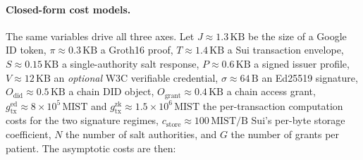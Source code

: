 \paragraph{Closed-form cost models.}
The same variables drive all three axes. Let $J\!\approx\!1.3\,\mathrm{KB}$
be the size of a Google ID token, $\pi\!\approx\!0.3\,\mathrm{KB}$ a
Groth16 proof, $T\!\approx\!1.4\,\mathrm{KB}$ a Sui transaction
envelope, $S\!\approx\!0.15\,\mathrm{KB}$ a single-authority salt
response, $P\!\approx\!0.6\,\mathrm{KB}$ a signed issuer profile,
$V\!\approx\!12\,\mathrm{KB}$ an \emph{optional} W3C verifiable
credential, $\sigma\!\approx\!64\,\mathrm{B}$ an Ed25519 signature,
$O_{\text{did}}\!\approx\!0.5\,\mathrm{KB}$ a chain DID object,
$O_{\text{grant}}\!\approx\!0.4\,\mathrm{KB}$ a chain access grant,
$g_{\text{tx}}^{\text{ed}}\!\approx\!8\!\times\!10^{5}\,\mathrm{MIST}$
and
$g_{\text{tx}}^{\text{zk}}\!\approx\!1.5\!\times\!10^{6}\,\mathrm{MIST}$
the per-transaction computation costs for the two signature regimes,
$c_{\text{store}}\!\approx\!100\,\mathrm{MIST}/\mathrm{B}$ Sui's per-byte
storage coefficient, $N$ the number of salt authorities, and $G$ the
number of grants per patient. The asymptotic costs are then:
